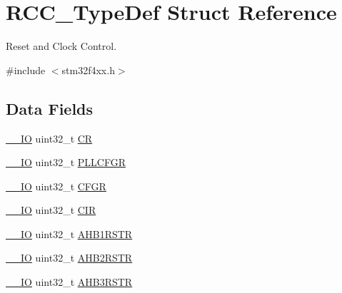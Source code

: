 \hypertarget{struct_r_c_c___type_def}{}\section{R\+C\+C\+\_\+\+Type\+Def Struct Reference}
\label{struct_r_c_c___type_def}


Reset and Clock Control.  




{\ttfamily \#include $<$stm32f4xx.\+h$>$}

\subsection*{Data Fields}
\begin{DoxyCompactItemize}
\item 
\hyperlink{group___c_m_s_i_s__core__definitions_gaec43007d9998a0a0e01faede4133d6be}{\+\_\+\+\_\+\+IO} uint32\+\_\+t \hyperlink{struct_r_c_c___type_def_ab40c89c59391aaa9d9a8ec011dd0907a}{CR}
\item 
\hyperlink{group___c_m_s_i_s__core__definitions_gaec43007d9998a0a0e01faede4133d6be}{\+\_\+\+\_\+\+IO} uint32\+\_\+t \hyperlink{struct_r_c_c___type_def_ae6ff257862eba6b4b367feea786bf1fd}{P\+L\+L\+C\+F\+GR}
\item 
\hyperlink{group___c_m_s_i_s__core__definitions_gaec43007d9998a0a0e01faede4133d6be}{\+\_\+\+\_\+\+IO} uint32\+\_\+t \hyperlink{struct_r_c_c___type_def_a26f1e746ccbf9c9f67e7c60e61085ec1}{C\+F\+GR}
\item 
\hyperlink{group___c_m_s_i_s__core__definitions_gaec43007d9998a0a0e01faede4133d6be}{\+\_\+\+\_\+\+IO} uint32\+\_\+t \hyperlink{struct_r_c_c___type_def_a907d8154c80b7e385478943f90b17a3b}{C\+IR}
\item 
\hyperlink{group___c_m_s_i_s__core__definitions_gaec43007d9998a0a0e01faede4133d6be}{\+\_\+\+\_\+\+IO} uint32\+\_\+t \hyperlink{struct_r_c_c___type_def_a46c20c598e9e12f919f0ea47ebcbc90f}{A\+H\+B1\+R\+S\+TR}
\item 
\hyperlink{group___c_m_s_i_s__core__definitions_gaec43007d9998a0a0e01faede4133d6be}{\+\_\+\+\_\+\+IO} uint32\+\_\+t \hyperlink{struct_r_c_c___type_def_a78a5aa9dd5694c48a7d8e66888a46450}{A\+H\+B2\+R\+S\+TR}
\item 
\hyperlink{group___c_m_s_i_s__core__definitions_gaec43007d9998a0a0e01faede4133d6be}{\+\_\+\+\_\+\+IO} uint32\+\_\+t \hyperlink{struct_r_c_c___type_def_a28560c5bfeb45326ea7f2019dba57bea}{A\+H\+B3\+R\+S\+TR}
\item 

\end{DoxyCompactItemize}
